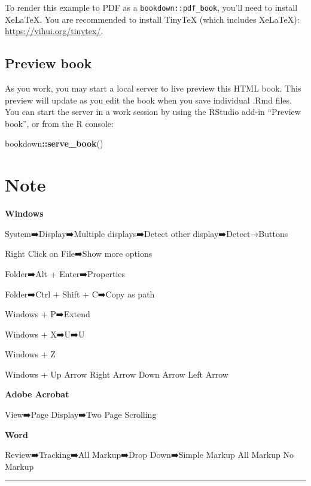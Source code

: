 \documentclass[
]{book}
\newenvironment{Shaded}{\begin{snugshade}}{\end{snugshade}}
\newcommand{\FunctionTok}[1]{\textcolor[rgb]{0.13,0.29,0.53}{\textbf{#1}}}
\newcommand{\NormalTok}[1]{#1}
\newcommand{\SpecialCharTok}[1]{\textcolor[rgb]{0.81,0.36,0.00}{\textbf{#1}}}
\begin{document}
To render this example to PDF as a \texttt{bookdown::pdf\_book}, you'll need to install XeLaTeX. You are recommended to install TinyTeX (which includes XeLaTeX): \url{https://yihui.org/tinytex/}.

\hypertarget{preview-book}{%
\section{Preview book}\label{preview-book}}

As you work, you may start a local server to live preview this HTML book. This preview will update as you edit the book when you save individual .Rmd files. You can start the server in a work session by using the RStudio add-in ``Preview book'', or from the R console:

\begin{Shaded}
\begin{Highlighting}[]
\NormalTok{bookdown}\SpecialCharTok{::}\FunctionTok{serve\_book}\NormalTok{()}
\end{Highlighting}
\end{Shaded}

\hypertarget{helloworld}{%
\chapter{Note}\label{helloworld}}

\textbf{Windows}

System➡️Display➡️Multiple displays➡️Detect other display➡️Detect→Buttons

Right Click on File➡️Show more options

Folder➡️Alt + Enter➡️Properties

Folder➡️Ctrl + Shift + C➡️Copy as path

Windows + P➡️Extend

Windows + X➡️U➡️U

Windows + Z

Windows + Up Arrow \textbar{} Right Arrow \textbar{} Down Arrow \textbar{} Left Arrow

\textbf{Adobe Acrobat}

View➡️Page Display➡️Two Page Scrolling

\textbf{Word}

Review➡️Tracking➡️All Markup➡️Drop Down➡️Simple Markup \textbar{} All Markup \textbar{} No Markup

\begin{center}\rule{0.5\linewidth}{0.5pt}\end{center}
\end{document}
